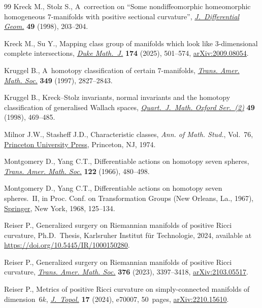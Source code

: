 \documentclass[pdftex]{sigma}
\numberwithin{equation}{section}
\theoremstyle{definition}
\numberwithin{table}{section}
\begin{document}
\begin{thebibliography}{99}
Kreck M., Stolz S., A~correction on ``{S}ome nondiffeomorphic homeomorphic
  homogeneous {$7$}-manifolds with positive sectional curvature'',
  \href{https://doi.org/10.4310/jdg/1214460941}{\textit{J.~Differential Geom.}}
  \textbf{49} (1998), 203--204.

Kreck M., Su Y., Mapping class group of manifolds which look like 3-dimensional
  complete intersections,
  \href{https://doi.org/10.1215/00127094-2024-0036}{\textit{Duke Math.~J.}}
  \textbf{174} (2025), 501--574,
  \href{https://arxiv.org/abs/2009.08054}{arXiv:2009.08054}.

Kruggel B., A~homotopy classification of certain {$7$}-manifolds,
  \href{https://doi.org/10.1090/S0002-9947-97-01962-4}{\textit{Trans. Amer.
  Math. Soc.}} \textbf{349} (1997), 2827--2843.

Kruggel B., Kreck--{S}tolz invariants, normal invariants and the homotopy
  classification of generalised {W}allach spaces,
  \href{https://doi.org/10.1093/qmathj/49.4.469}{\textit{Quart.~J.~Math. Oxford
  Ser.~(2)}} \textbf{49} (1998), 469--485.

Milnor J.W., Stasheff J.D., Characteristic classes, \textit{Ann. of Math.
  Stud.}, Vol.~76, \href{https://doi.org/10.1515/9781400881826}{Princeton
  University Press}, Princeton, NJ, 1974.

Montgomery D., Yang C.T., Differentiable actions on homotopy seven spheres,
  \href{https://doi.org/10.2307/1994562}{\textit{Trans. Amer. Math. Soc.}}
  \textbf{122} (1966), 480--498.

Montgomery D., Yang C.T., Differentiable actions on homotopy seven
  spheres.~{II}, in Proc. {C}onf. on {T}ransformation {G}roups ({N}ew
  {O}rleans, {L}a., 1967),
  \href{https://doi.org/10.1007/978-3-642-46141-5_4}{Springer}, New York, 1968,
  125--134.

Reiser P., Generalized surgery on {R}iemannian manifolds of positive {R}icci
  curvature, Ph.D.~Thesis, {K}arlsruher Institut f\"ur Technologie, 2024,
  available at \url{https://doi.org/10.5445/IR/1000150280}.

Reiser P., Generalized surgery on {R}iemannian manifolds of positive {R}icci
  curvature, \href{https://doi.org/10.1090/tran/8789}{\textit{Trans. Amer.
  Math. Soc.}} \textbf{376} (2023), 3397--3418,
  \href{https://arxiv.org/abs/2103.05517}{arXiv:2103.05517}.

Reiser P., Metrics of positive {R}icci curvature on simply-connected manifolds
  of dimension~{$6k$},
  \href{https://doi.org/10.1112/topo.70007}{\textit{J.~Topol.}} \textbf{17}
  (2024), e70007, 50~pages,
  \href{https://arxiv.org/abs/2210.15610}{arXiv:2210.15610}.


\end{thebibliography}
\end{document}
